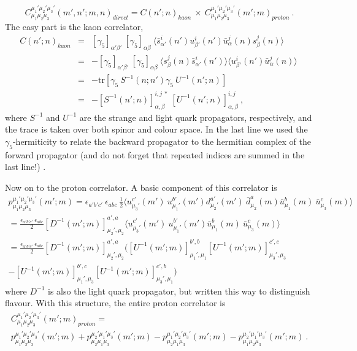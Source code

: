 \documentclass[%
 preprint,
nofootinbib,
 amsmath,amssymb,
 aps,
]{revtex4-2}
\begin{document}
\begin{equation}
C^{\mu_1'\mu_2'\mu_3'}_{\mu_1\mu_2\mu_3}(m',n';m,n)_{direct}=C(n';n)_{kaon}\ \times\ C^{\mu_1'\mu_2'\mu_3'}_{\mu_1\mu_2\mu_3}(m';m)_{proton}\ .
\end{equation}
The easy part is the kaon correlator,
\begin{eqnarray}
C(n';n)_{kaon} &=& [\gamma_5]_{\alpha'\beta'}\ [\gamma_5]_{\alpha\beta}
\ \langle \bar{s}_{\alpha'}^i(n')u_{\beta'}^i(n') \bar{u}_{\alpha}^j(n)s_{\beta}^j(n)\rangle\\
&=&-[\gamma_5]_{\alpha'\beta'}\ [\gamma_5]_{\alpha\beta}
\ \langle s_{\beta}^j(n)\bar{s}_{\alpha'}^i(n')\rangle \langle u_{\beta'}^i(n') \bar{u}_{\alpha}^j(n)\rangle\ \\
&=&-\mbox{tr}\left[\gamma_5\ S^{-1}(n;n')\gamma_5\ U^{-1}(n';n)\right]\\
&=&-[S^{-1}(n';n)]_{\alpha,\beta}^{i,j\ *}\ [U^{-1}(n';n)]_{\alpha,\beta}^{i,j} \ ,
\end{eqnarray}
where $S^{-1}$ and $U^{-1}$ are the strange and light quark propagators, respectively, and the trace is taken over both spinor and colour space.  In the last line we used the $\gamma_5$-hermiticity to relate the backward propagator to the hermitian complex of the forward propagator (and do not forget that repeated indices are summed in the last line!) .

Now on to the proton correlator.  A basic component of this correlator is
\begin{multline}
p^{\mu_1'\mu_2'\mu_3'}_{\mu_1\mu_2\mu_3}(m';m) = \epsilon_{a'b'c'}\ \epsilon_{abc}\  \frac{1}{2}
\langle u^{c'}_{\mu_3'}(m')\ u^{b'}_{\mu_1'}(m')d^{a'}_{\mu_2'}(m')\ \bar{d}^a_{\mu_2}(m)\bar{u}^b_{\mu_1}(m)\ \bar{u}^c_{\mu_3}(m)\rangle\\
=\frac{ \epsilon_{a'b'c'}\ \epsilon_{abc}}{2}[D^{-1}(m';m)]_{\mu_2',\mu_2}^{a',a}
\langle u^{c'}_{\mu_3'}(m')\ u^{b'}_{\mu_1'}(m')\bar{u}^b_{\mu_1}(m)\ \bar{u}^c_{\mu_3}(m)\rangle\\
=\frac{ \epsilon_{a'b'c'}\ \epsilon_{abc}}{2}[D^{-1}(m';m)]_{\mu_2',\mu_2}^{a',a}
([U^{-1}(m';m)]_{\mu_1',\mu_1}^{b',b}[U^{-1}(m';m)]_{\mu_3',\mu_3}^{c',c}\\
-[U^{-1}(m';m)]_{\mu_1',\mu_3}^{b',c}[U^{-1}(m';m)]_{\mu_3',\mu_1}^{c',b})
\end{multline}
where $D^{-1}$ is also the light quark propagator, but written this way to distinguish flavour.  With this structure, the entire proton correlator is
\begin{multline}
C^{\mu_1'\mu_2'\mu_3'}_{\mu_1\mu_2\mu_3}(m';m)_{proton}=\\
p^{\mu_1'\mu_2'\mu_3'}_{\mu_1\mu_2\mu_3}(m';m) + 
p^{\mu_2'\mu_1'\mu_3'}_{\mu_2\mu_1\mu_3}(m';m) -
p^{\mu_1'\mu_2'\mu_3'}_{\mu_2\mu_1\mu_3}(m';m)  -
p^{\mu_2'\mu_1'\mu_3'}_{\mu_1\mu_2\mu_3}(m';m) \ . 
\end{multline}
\end{document}
